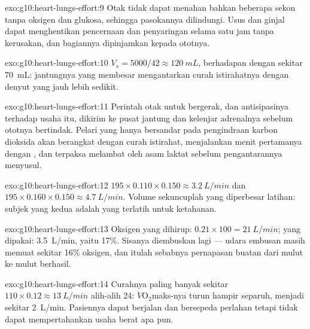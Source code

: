 \begin{solution}{exo:g10:heart-lungs-effort:9}
Otak tidak dapat menahan bahkan beberapa sekon tanpa oksigen dan
glukosa, sehingga pasokannya dilindungi. Usus dan ginjal dapat
menghentikan pencernaan dan penyaringan selama satu jam tanpa
kerusakan, dan bagiannya dipinjamkan kepada ototnya.
\end{solution}

\begin{solution}{exo:g10:heart-lungs-effort:10}
$V_s = 5000/42 \approx \qty{120}{mL}$, berhadapan dengan sekitar
\qty{70}{mL}: jantungnya yang membesar mengantarkan curah istirahatnya
dengan denyut yang jauh lebih sedikit.
\end{solution}

\begin{solution}{exo:g10:heart-lungs-effort:11}
Perintah otak untuk bergerak, dan antisipasinya terhadap usaha itu,
dikirim ke pusat jantung dan kelenjar adrenalnya sebelum ototnya
bertindak. Pelari yang hanya bersandar pada pengindraan karbon dioksida
akan berangkat dengan curah istirahat, menjalankan menit pertamanya
dengan , dan terpaksa melambat oleh asam laktat sebelum
pengantarannya menyusul.
\end{solution}

\begin{solution}{exo:g10:heart-lungs-effort:12}
$195 \times 0.110 \times 0.150 \approx \qty{3.2}{L/min}$ dan
$195 \times 0.160 \times 0.150 \approx \qty{4.7}{L/min}$. Volume
sekuncuplah yang diperbesar latihan: subjek yang kedua adalah yang
terlatih untuk ketahanan.
\end{solution}

\begin{solution}{exo:g10:heart-lungs-effort:13}
Oksigen yang dihirup: $0.21 \times 100 = \qty{21}{L/min}$; yang
dipakai: \qty{3.5}{L/min}, yaitu 17\%. Sisanya diembuskan lagi ---
udara embusan masih memuat sekitar 16\% oksigen, dan itulah sebabnya
pernapasan buatan dari mulut ke mulut berhasil.
\end{solution}

\begin{solution}{exo:g10:heart-lungs-effort:14}
Curahnya paling banyak sekitar $110 \times 0.12 \approx \qty{13}{L/min}$
alih-alih 24: $\dot V\!\mathrm{O_2}$maks-nya turun hampir separuh,
menjadi sekitar \qty{2}{L/min}. Pasiennya dapat berjalan dan bersepeda
perlahan tetapi tidak dapat mempertahankan usaha berat apa pun.
\end{solution}

